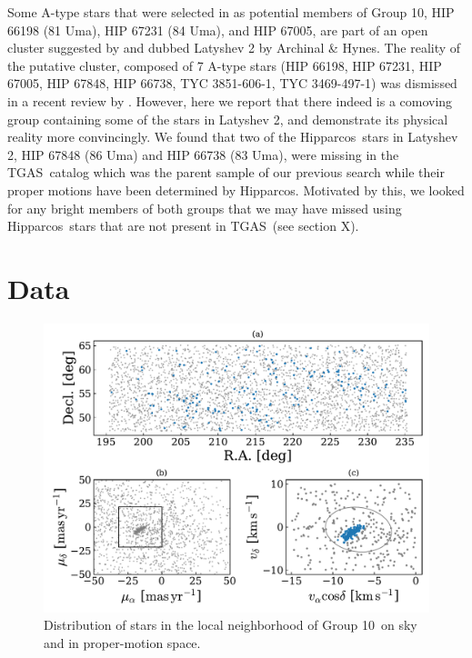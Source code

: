 \documentclass[modern,letterpaper]{aastex61}
\newcommand{\acronym}[1]{{\small{#1}}}
\newcommand{\hipparcos}{Hipparcos}
\newcommand{\tgas}{\acronym{TGAS}}
\newcommand{\groupTen}{Group 10}
\newcommand{\todo}[1]{{\color{crimson}#1}}
\begin{document}
Some A-type stars that were selected in \citet{2017AJ....153..257O} as potential
members of \groupTen,
HIP 66198 (81 Uma), HIP 67231 (84 Uma), and HIP 67005, are part of an open cluster
suggested by \citet{1977ATsir.969....7L} and dubbed Latyshev 2 by Archinal \& Hynes.
The reality of the putative cluster, composed of 7 A-type stars
(HIP 66198,
HIP 67231,
HIP 67005,
HIP 67848,
HIP 66738,
TYC 3851-606-1,
TYC 3469-497-1)
was dismissed in a recent review by \citet{2016IAUS..314...21M}.
However, here we report that there indeed is a comoving group containing
some of the stars in Latyshev 2, and demonstrate
its physical reality more convincingly.
%
We found that two of the \hipparcos\ stars in Latyshev 2,
HIP 67848 (86 Uma) and HIP 66738 (83 Uma),
were missing in the \tgas\ catalog which was the parent sample of our previous search while
their proper motions have been determined by \hipparcos.
Motivated by this, we looked for any bright members of both groups that we
may have missed using \hipparcos\ stars that are not present in \tgas\ (\todo{see section X}).

\section{Data}
\label{sec:data}

\begin{figure}
  \includegraphics[width=0.95\linewidth]{g10_sky_pm.pdf}
  \caption{Distribution of stars in the local neighborhood of \groupTen\ on sky and in proper-motion space.}
  \label{fig:distributions}
\end{figure}
\end{document}
